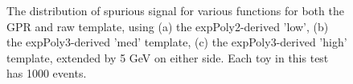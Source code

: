 \begin{figure} 
\begin{center}

\caption{The distribution of spurious signal for various functions for both the GPR and raw template, using (a) the expPoly2-derived 'low', (b) the expPoly3-derived 'med' template, (c) the expPoly3-derived 'high' template, extended by 5 GeV on either side. Each toy in this test has 1000 events.}
\label{fig:padded_lowpt_1000_noSig}
\end{center}
\end{figure}

